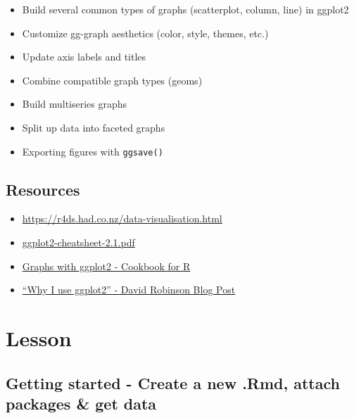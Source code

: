 \documentclass[]{book}
\providecommand{\tightlist}{%
  \setlength{\itemsep}{0pt}\setlength{\parskip}{0pt}}
\begin{document}
\begin{itemize}
\tightlist
\item
  Build several common types of graphs (scatterplot, column, line) in ggplot2
\item
  Customize gg-graph aesthetics (color, style, themes, etc.)
\item
  Update axis labels and titles
\item
  Combine compatible graph types (geoms)
\item
  Build multiseries graphs
\item
  Split up data into faceted graphs
\item
  Exporting figures with \texttt{ggsave()}
\end{itemize}

\hypertarget{resources-4}{%
\subsection{Resources}\label{resources-4}}

\begin{itemize}
\tightlist
\item
  \href{Chapter\%203\%20-\%20Data\%20Visualization\%20in\%20R\%20for\%20Data\%20Science\%20by\%20Grolemund\%20and\%20Wickham}{https://r4ds.had.co.nz/data-visualisation.html}
\item
  \href{https://www.rstudio.com/wp-content/uploads/2016/11/ggplot2-cheatsheet-2.1.pdf}{ggplot2-cheatsheet-2.1.pdf}\\
\item
  \href{http://www.cookbook-r.com/Graphs/\#graphs-with-ggplot2}{Graphs with ggplot2 - Cookbook for R}\\
\item
  \href{http://varianceexplained.org/r/why-I-use-ggplot2/}{``Why I use ggplot2'' - David Robinson Blog Post}
\end{itemize}

\hypertarget{lesson-1}{%
\section{Lesson}\label{lesson-1}}

\hypertarget{getting-started---create-a-new-.rmd-attach-packages-get-data}{%
\subsection{Getting started - Create a new .Rmd, attach packages \& get data}\label{getting-started---create-a-new-.rmd-attach-packages-get-data}}
\end{document}
